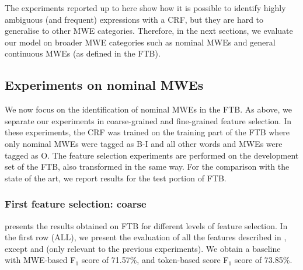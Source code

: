 \documentclass[output=paper,modfonts]{langscibook}
\begin{document}
The experiments reported up to here show how it is possible to identify highly ambiguous (and frequent) expressions with a CRF, but they are hard to generalise to other MWE categories. Therefore, in the next sections, we evaluate our model on broader MWE categories such as nominal MWEs and general continuous MWEs (as defined in the FTB).


\subsection{Experiments on nominal MWEs}
\label{schol:sec:results-nominal}

We now focus on the identification of nominal MWEs in the FTB. As above, we separate our experiments in coarse-grained and fine-grained feature selection. In these experiments, the CRF was trained on the training part of the FTB where only nominal MWEs were tagged as B-I and all other words and MWEs were tagged as O. The feature selection experiments are performed on the development set of the FTB, also transformed in the same way. %
For the comparison with the state of the art, we report results for the test portion of FTB.



\subsubsection{First feature selection: coarse}
\label{schol:sec:results-nominal-feat-coarse}
 presents the results obtained on FTB for different levels of feature selection. In the first row (ALL), we present the evaluation of all the features described in , except  and  (only relevant to the previous experiments). We obtain a baseline with MWE-based F$_1$ score of 71.57\%, and token-based score F$_1$ score of 73.85\%. 
\end{document}
